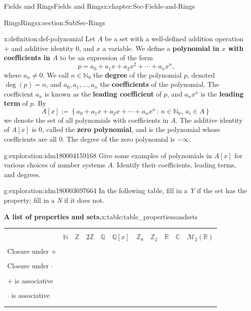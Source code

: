 \documentclass[oneside,10pt,]{book}
\newcommand{\tabularfont}{\relax}
\newcommand{\terminology}[1]{\textbf{#1}}
\numberwithin{equation}{section}
\newcommand{\hrulethin}  {\noalign{\hrule height 0.04em}}
\newcommand{\setof}[2]{{\left\{#1\,\colon\,#2\right\}}}
\def\C{{\mathbb C}}
\def\Z{{\mathbb Z}}
\def\Q{{\mathbb Q}}
\def\N{{\mathbb N}}
\def\R{{\mathbb R}}
\begin{document}
\begin{chapterptx}{Fields and Rings}{}{Fields and Rings}{}{}{x:chapter:Sec-Fields-and-Rings}
\begin{sectionptx}{Rings}{}{Rings}{}{}{x:section:SubSec-Rings}
\begin{definition}{}{x:definition:def-polynomial}%
Let \(A\) be a set with a well-defined addition operation \(+\) and additive identity \(0\), and \(x\) a variable. We define a \terminology{polynomial in \(x\) with coefficients in \(A\)} to be an expression of the form%
\begin{equation*}
p = a_0 + a_1 x + a_2 x^2 + \cdots + a_n x^n\text{,}
\end{equation*}
where \(a_n\ne 0\). We call \(n\in \N_0\) the \terminology{degree} of the polynomial \(p\), denoted \(\deg(p) = n\), and \(a_0,a_1,\ldots,
a_n\) the \terminology{coefficients} of the polynomial. The coefficient \(a_n\) is known as the \terminology{leading coefficient} of \(p\), and \(a_n x^n\) is the \terminology{leading term} of \(p\). By%
\begin{equation*}
A[x] := \setof{a_0 + a_1 x + a_2 x + \cdots + a_n x^n}{n\in \N_0, \ a_i\in A}
\end{equation*}
we denote the set of all polynomials with coefficients in \(A\). The additive identity of \(A[x]\) is \(0\), called the \terminology{zero polynomial}, and is the polynomial whose coefficients are all \(0\). The degree of the zero polynomial is \(-\infty\).%
\end{definition}
\begin{exploration}{}{g:exploration:idm180004159168}%
Give some examples of polynomials in \(A[x]\) for various choices of number systems \(A\). Identify their coefficients, leading terms, and degrees.%
\end{exploration}
\begin{exploration}{}{g:exploration:idm180003697664}%
In the following table, fill in a \emph{Y} if the set has the property; fill in a \emph{N} if it does not.%
\begin{tableptx}{\textbf{A list of properties and sets.}}{x:table:table_propertiessandsets}{}%
\centering
{\tabularfont%
\begin{tabular}{lllllllllll}
&&&&&&&&&&\tabularnewline\hrulethin
&\(\N\)&\(\Z\)&\(2\Z\)&\(\Q\)&\(\Q[x]\)&\(\Z_{8}\)&\(\Z_{2}\)&\(\R\)&\(\C\)&\(\mathcal{M}_2(\R)\)\tabularnewline[0pt]
&&&&&&&&&&\tabularnewline\hrulethin
Closure under +&&&&&&&&&&\tabularnewline[0pt]
&&&&&&&&&&\tabularnewline\hrulethin
Closure under \(\cdot\)&&&&&&&&&&\tabularnewline[0pt]
&&&&&&&&&&\tabularnewline\hrulethin
\(+\) is associative&&&&&&&&&&\tabularnewline[0pt]
&&&&&&&&&&\tabularnewline\hrulethin
\(\cdot\) is associative&&&&&&&&&&\tabularnewline[0pt]
&&&&&&&&&&\tabularnewline\hrulethin

\end{tabular}}
\end{tableptx}
\end{exploration}
\end{sectionptx}
\end{chapterptx}
\end{document}

